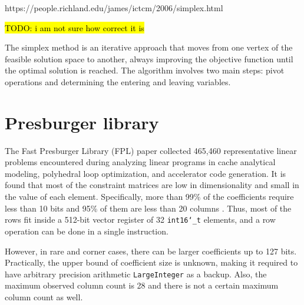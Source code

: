 \documentclass[logo,bsc,singlespacing,parskip]{infthesis}
\newcommand{\dtshort}{\texttt{int16\char`_t}}
\begin{document}

https://people.richland.edu/james/ictcm/2006/simplex.html

\hl{TODO: i am not sure how correct it is}

The simplex method is an iterative approach that moves from one vertex of the
feasible solution space to another, always improving the objective function 
until the optimal solution is reached. The algorithm involves two main steps: 
pivot operations and determining the entering and leaving variables.







\section{Presburger library}

The Fast Presburger Library (FPL) paper collected 465,460 representative linear
problems encountered during analyzing linear programs in cache analytical
modeling, polyhedral loop optimization, and accelerator code generation. It is
found that most of the constraint matrices are low in dimensionality and small
in the value of each element. Specifically, more than 99\% of the coefficients
require less than 10 bits and 95\% of them are less than 20 columns \cite{FPL1}.
Thus, most of the rows fit inside a 512-bit vector register of 32
\dtshort{} elements, and a row operation can be done in a single
instruction. 

However, in rare and corner cases, there can be larger coefficients up to 127
bits. Practically, the upper bound of coefficient size is unknown, making it
required to have arbitrary precision arithmetic \texttt{LargeInteger} as a
backup. Also, the maximum observed column count is 28 and there is not a certain
maximum column count as well. 
\end{document}
